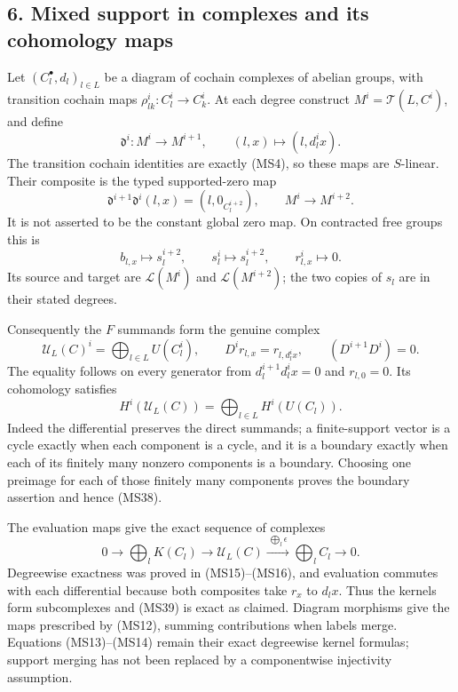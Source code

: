 \documentclass[
]{article}
\begin{document}
\subsection{6. Mixed support in complexes and its cohomology
maps}\label{mixed-support-in-complexes-and-its-cohomology-maps}

Let \((C_l^\bullet,d_l)_{l\in L}\) be a diagram of cochain complexes of
abelian groups, with transition cochain maps
\(\rho_{lk}^i:C_l^i\to C_k^i\). At each degree construct
\(M^i=\mathcal T(L,C^i)\), and define \[
\mathfrak d^i:M^i\to M^{i+1},\qquad(l,x)\longmapsto(l,d_l^i x).
\tag{MS34}
\] The transition cochain identities are exactly (MS4), so these maps
are \(S\)-linear. Their composite is the typed supported-zero map \[
\mathfrak d^{i+1}\mathfrak d^i(l,x)=(l,0_{C_l^{i+2}}),
\qquad M^i\longrightarrow M^{i+2}.
\tag{MS35}
\] It is not asserted to be the constant global zero map. On contracted
free groups this is \[
b_{l,x}\longmapsto s_l^{i+2},\qquad
s_l^i\longmapsto s_l^{i+2},\qquad
r_{l,x}^i\longmapsto0.
\tag{MS36}
\] Its source and target are \(\mathscr L(M^i)\) and
\(\mathscr L(M^{i+2})\); the two copies of \(s_l\) are in their stated
degrees.

Consequently the \(F\) summands form the genuine complex \[
\mathscr U_L(C)^i=\bigoplus_{l\in L}U(C_l^i),\qquad
D^i r_{l,x}=r_{l,d_l^i x},\qquad (D^{i+1}D^i)=0.
\tag{MS37}
\] The equality follows on every generator from \(d_l^{i+1}d_l^i x=0\)
and \(r_{l,0}=0\). Its cohomology satisfies \[
H^i(\mathscr U_L(C))=\bigoplus_{l\in L}H^i(U(C_l)).
\tag{MS38}
\] Indeed the differential preserves the direct summands; a
finite-support vector is a cycle exactly when each component is a cycle,
and it is a boundary exactly when each of its finitely many nonzero
components is a boundary. Choosing one preimage for each of those
finitely many components proves the boundary assertion and hence (MS38).

The evaluation maps give the exact sequence of complexes \[
0\longrightarrow\bigoplus_l K(C_l)
\longrightarrow\mathscr U_L(C)
\xrightarrow{\ \bigoplus_l\epsilon\ }\bigoplus_l C_l
\longrightarrow0.
\tag{MS39}
\] Degreewise exactness was proved in (MS15)--(MS16), and evaluation
commutes with each differential because both composites take \(r_x\) to
\(d_lx\). Thus the kernels form subcomplexes and (MS39) is exact as
claimed. Diagram morphisms give the maps prescribed by (MS12), summing
contributions when labels merge. Equations (MS13)--(MS14) remain their
exact degreewise kernel formulas; support merging has not been replaced
by a componentwise injectivity assumption.
\end{document}
